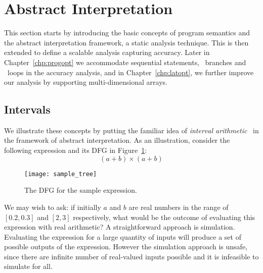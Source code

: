 \section{Abstract Interpretation}
\label{bg:sec:abstract_interpretation}

This section starts by introducing the basic concepts of program semantics
and the abstract interpretation framework, a static analysis technique.  This
is then extended to define a scalable analysis capturing accuracy.  Later in
Chapter~\ref{chp:progopt} we accommodate sequential statements, \iflit~branches
and \whilelit~loops in the accuracy analysis, and in Chapter~\ref{chp:latopt},
we further improve our analysis by supporting multi-dimensional arrays.


\subsection{Intervals}
\label{bg:sub:intervals}

We illustrate these concepts by putting the familiar idea of \emph{interval
arithmetic}~\cite{moore} in the framework of abstract interpretation. As
an illustration, consider the following expression and its DFG in
Figure~\ref{bg:fig:sample_tree}\@:
\begin{equation}
    (a + b) \times (a + b)
    \label{bg:eq:absint_sample}
\end{equation}
\begin{figure}[ht]
    \centering
    \texttt{[image: sample\_tree]}
    \caption{The DFG for the sample expression.}\label{bg:fig:sample_tree}
\end{figure}

We may wish to ask: if initially $a$ and $b$ are real numbers in the range of
$[0.2, 0.3]$ and $[2, 3]$ respectively, what would be the outcome of evaluating
this expression with real arithmetic? A straightforward approach is simulation.
Evaluating the expression for a large quantity of inputs will produce a set
of possible outputs of the expression. However the simulation approach is
unsafe, since there are infinite number of real-valued inputs possible and it
is infeasible to simulate for all.


